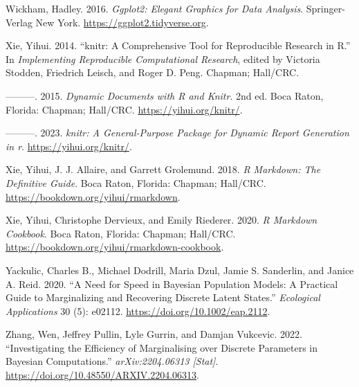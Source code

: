 \begin{CSLReferences}{1}{0}
\leavevmode{}%
Wickham, Hadley. 2016. \emph{Ggplot2: Elegant Graphics for Data Analysis}. Springer-Verlag New York. \url{https://ggplot2.tidyverse.org}.

\leavevmode{}%
Xie, Yihui. 2014. {``{knitr}: A Comprehensive Tool for Reproducible Research in {R}.''} In \emph{Implementing Reproducible Computational Research}, edited by Victoria Stodden, Friedrich Leisch, and Roger D. Peng. Chapman; Hall/CRC.

\leavevmode{}%
---------. 2015. \emph{Dynamic Documents with {R} and Knitr}. 2nd ed. Boca Raton, Florida: Chapman; Hall/CRC. \url{https://yihui.org/knitr/}.

\leavevmode{}%
---------. 2023. \emph{{knitr}: A General-Purpose Package for Dynamic Report Generation in r}. \url{https://yihui.org/knitr/}.

\leavevmode{}%
Xie, Yihui, J. J. Allaire, and Garrett Grolemund. 2018. \emph{R Markdown: The Definitive Guide}. Boca Raton, Florida: Chapman; Hall/CRC. \url{https://bookdown.org/yihui/rmarkdown}.

\leavevmode{}%
Xie, Yihui, Christophe Dervieux, and Emily Riederer. 2020. \emph{R Markdown Cookbook}. Boca Raton, Florida: Chapman; Hall/CRC. \url{https://bookdown.org/yihui/rmarkdown-cookbook}.

\leavevmode{}%
Yackulic, Charles B., Michael Dodrill, Maria Dzul, Jamie S. Sanderlin, and Janice A. Reid. 2020. {``A Need for Speed in Bayesian Population Models: A Practical Guide to Marginalizing and Recovering Discrete Latent States.''} \emph{Ecological Applications} 30 (5): e02112. \url{https://doi.org/10.1002/eap.2112}.

\leavevmode{}%
Zhang, Wen, Jeffrey Pullin, Lyle Gurrin, and Damjan Vukcevic. 2022. {``Investigating the Efficiency of Marginalising over Discrete Parameters in {B}ayesian Computations.''} \emph{arXiv:2204.06313 {[}Stat{]}}. \url{https://doi.org/10.48550/ARXIV.2204.06313}.

\end{CSLReferences}


\address{%
Jeffrey M. Pullin\\
University of Melbourne\\%
School of Mathematics and Statistics\\ Melbourne, Australia\\
%
%
\textit{ORCiD: \href{https://orcid.org/0000-0003-3651-5471}{0000-0003-3651-5471}}\\%
%
}

